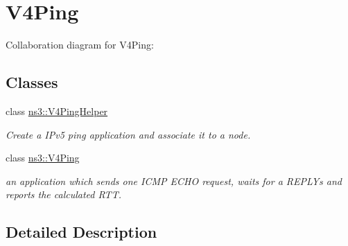 \hypertarget{group__v4ping}{}\section{V4\+Ping}
\label{group__v4ping}
Collaboration diagram for V4\+Ping\+:
\subsection*{Classes}
\begin{DoxyCompactItemize}
\item 
class \hyperlink{classns3_1_1V4PingHelper}{ns3\+::\+V4\+Ping\+Helper}
\begin{DoxyCompactList}\small\item\em Create a I\+Pv5 ping application and associate it to a node. \end{DoxyCompactList}\item 
class \hyperlink{classns3_1_1V4Ping}{ns3\+::\+V4\+Ping}
\begin{DoxyCompactList}\small\item\em an application which sends one I\+C\+MP E\+C\+HO request, waits for a R\+E\+P\+L\+Ys and reports the calculated R\+TT. \end{DoxyCompactList}\end{DoxyCompactItemize}


\subsection{Detailed Description}
